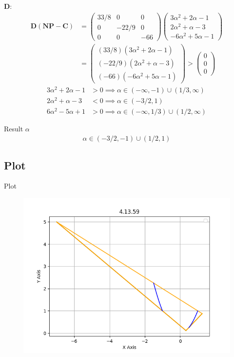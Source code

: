 \documentclass{beamer}
\providecommand{\brak}[1]{\ensuremath{\left(#1\right)}}
\theoremstyle{remark}
\newcommand{\myvec}[1]{\ensuremath{\begin{pmatrix}#1\end{pmatrix}}}
\let\vec\mathbf
\numberwithin{equation}{section}
\begin{document}
\begin{frame}
  $\vec{D}$:
\begin{align}
 \vec{D}(\vec{N}\vec{P}-\vec{C}) &= \myvec{33/8 & 0 & 0 \\ 0 & -22/9 & 0 \\ 0 & 0 & -66} \myvec{3\alpha^2+2\alpha-1 \\ 2\alpha^2+\alpha-3 \\ -6\alpha^2+5\alpha-1} \\
 &= \myvec{(33/8)(3\alpha^2+2\alpha-1) \\ (-22/9)(2\alpha^2+\alpha-3) \\ (-66)(-6\alpha^2+5\alpha-1)} > \myvec{0 \\ 0 \\ 0}
\end{align}
\begin{align}
 3\alpha^2+2\alpha-1 &> 0 \implies \alpha \in \brak{-\infty, -1} \cup \brak{1/3, \infty} \\
 2\alpha^2+\alpha-3 &< 0 \implies \alpha \in \brak{-3/2, 1} \\
 6\alpha^2-5\alpha+1 &> 0 \implies \alpha \in \brak{-\infty, 1/3} \cup \brak{1/2, \infty}
\end{align}
\end{frame}
\begin{frame}{Result}
  $\alpha$ 
\begin{align}
 \alpha \in \brak{-3/2,-1} \cup \brak{1/2, 1}
\end{align}
\end{frame}
\subsection{Plot}
\begin{frame}{Plot}
 \begin{figure}[H]
    \centering
    \includegraphics[width=0.8\columnwidth]{../figs/plot.png}
    \caption*{}
    \label{fig:plot}
\end{figure}
\end{frame}
\end{document}
